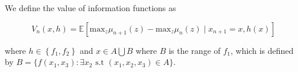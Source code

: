 \documentclass[12pt,english]{article}
\newcommand{\stcomment}[1]{{\color{red} st: #1}}
\begin{document}

We define the value of information functions as

\[
V_{n}\left(x,h\right)=\mathbb{E}\left[\mbox{max}_{z}\mu_{n+1}\left(z\right)-\mbox{max}_{z}\mu_{n}\left(z\right)\mid x_{n+1}=x,h\left(x\right)\right]
\]

where $h\in\left\{f_{1},f_{2}\right\} $ and $x\in A\bigcup B$ where $B$ is the range of  $f_{1}$, which is defined by $B=\{f\left(x_{1},x_{3}\right):\exists x_{2}\mbox{ s.t }\left(x_{1},x_{2},x_{3}\right)\in A\}$.
\end{document}
